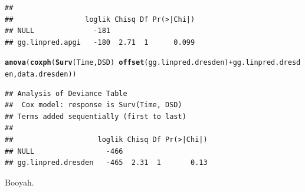 \documentclass{article}\usepackage[]{graphicx}\usepackage[]{color}
\makeatletter
\newcommand{\hlopt}[1]{\textcolor[rgb]{0,0,0}{#1}}%
\newcommand{\hlstd}[1]{\textcolor[rgb]{0.345,0.345,0.345}{#1}}%
\newcommand{\hlkwd}[1]{\textcolor[rgb]{0.737,0.353,0.396}{\textbf{#1}}}%
\newenvironment{kframe}{%
 \def\at@end@of@kframe{}%
 \ifinner\ifhmode%
  \def\at@end@of@kframe{\end{minipage}}%
  \begin{minipage}{\columnwidth}%
 \fi\fi%
 \def\FrameCommand##1{\hskip\@totalleftmargin \hskip-\fboxsep
 \colorbox{shadecolor}{##1}\hskip-\fboxsep
     \hskip-\linewidth \hskip-\@totalleftmargin \hskip\columnwidth}%
 \MakeFramed {\advance\hsize-\width
   \@totalleftmargin\z@ \linewidth\hsize
   \@setminipage}}%
 {\par\unskip\endMakeFramed%
 \at@end@of@kframe}
\newenvironment{knitrout}{}{} %
\makeatother
\begin{document}
\begin{knitrout}
\begin{kframe}
\begin{verbatim}
## 
##                 loglik Chisq Df Pr(>|Chi|)
## NULL              -181                    
## gg.linpred.apgi   -180  2.71  1      0.099
\end{verbatim}
\begin{alltt}
\hlkwd{anova}\hlstd{(}\hlkwd{coxph}\hlstd{(}\hlkwd{Surv}\hlstd{(Time, DSD)} \hlopt{~} \hlkwd{offset}\hlstd{(gg.linpred.dresden)} \hlopt{+} \hlstd{gg.linpred.dresden, data.dresden))}
\end{alltt}
\begin{verbatim}
## Analysis of Deviance Table
##  Cox model: response is Surv(Time, DSD)
## Terms added sequentially (first to last)
## 
##                    loglik Chisq Df Pr(>|Chi|)
## NULL                 -466                    
## gg.linpred.dresden   -465  2.31  1       0.13
\end{verbatim}
\end{kframe}
\end{knitrout}
Booyah.
\end{document}
